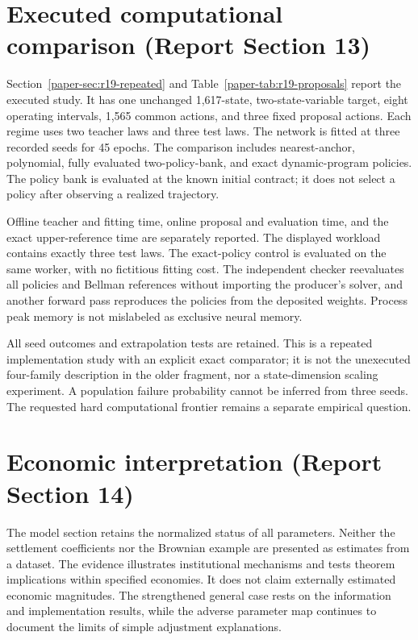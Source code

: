 \section{Executed computational comparison (Report Section 13)}
Section~\ref{paper-sec:r19-repeated} and Table~\ref{paper-tab:r19-proposals} report the executed study. It has one unchanged 1,617-state, two-state-variable target, eight operating intervals, 1,565 common actions, and three fixed proposal actions. Each regime uses two teacher laws and three test laws. The network is fitted at three recorded seeds for 45 epochs. The comparison includes nearest-anchor, polynomial, fully evaluated two-policy-bank, and exact dynamic-program policies. The policy bank is evaluated at the known initial contract; it does not select a policy after observing a realized trajectory.

Offline teacher and fitting time, online proposal and evaluation time, and the exact upper-reference time are separately reported. The displayed workload contains exactly three test laws. The exact-policy control is evaluated on the same worker, with no fictitious fitting cost. The independent checker reevaluates all policies and Bellman references without importing the producer's solver, and another forward pass reproduces the policies from the deposited weights. Process peak memory is not mislabeled as exclusive neural memory.

All seed outcomes and extrapolation tests are retained. This is a repeated implementation study with an explicit exact comparator; it is not the unexecuted four-family description in the older fragment, nor a state-dimension scaling experiment. A population failure probability cannot be inferred from three seeds. The requested hard computational frontier remains a separate empirical question.

\section{Economic interpretation (Report Section 14)}
The model section retains the normalized status of all parameters. Neither the settlement coefficients nor the Brownian example are presented as estimates from a dataset. The evidence illustrates institutional mechanisms and tests theorem implications within specified economies. It does not claim externally estimated economic magnitudes. The strengthened general case rests on the information and implementation results, while the adverse parameter map continues to document the limits of simple adjustment explanations.

